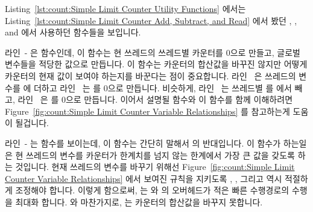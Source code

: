 \begin{lineref}
Listing~\ref{lst:count:Simple Limit Counter Utility Functions} 에서는
Listing~\ref{lst:count:Simple Limit Counter Add, Subtract, and Read} 에서 봤던 
, , and  에서 사용하던
함수들을 보입니다.

\begin{lineref}
라인~- 은  함수인데, 이 함수는 현
쓰레드의 쓰레드별 카운터를 0으로 만들고, 글로벌 변수들을 적당한 값으로
만듭니다.
이 함수는 카운터의 합산값을 바꾸진 않지만 어떻게 카운터의 현재 값이 보여야
하는지를 바꾼다는 점이 중요합니다.
라인~ 은 쓰레드의  변수를  에 더하고
라인~ 는  를 0으로 만듭니다.
비슷하게, 라인~ 는 쓰레드별  를 
에서 빼고, 라인~ 은  를 0으로 만듭니다.
이어서 설명될  함수와 이 함수를 함께 이해하려면
Figure~\ref{fig:count:Simple Limit Counter Variable Relationships}
를 참고하는게 도움이 될겁니다.

\end{lineref}

\begin{lineref}
라인~- 는  함수를 보이는데, 이 함수는
간단히 말해서  의 반대입니다.
이 함수가 하는일은 현 쓰레드의  변수를 카운터가
 한계치를 넘지 않는 한계에서 가장 큰 값을 갖도록 하는
것입니다.
현재 쓰레드의  변수를 바꾸기 위해선
Figure~\ref{fig:count:Simple Limit Counter Variable Relationships} 에서 보여진
규칙을 지키도록 , , 그리고  역시
적절하게 조정해야 합니다.
이렇게 함으로써,  는  와 
의 오버헤드가 적은 빠른 수행경로의 수행을 최대화 합니다.
 와 마찬가지로,  는 카운터의 합산값을
바꾸지 못합니다.
\iffalse


\end{lineref}
\end{lineref}
